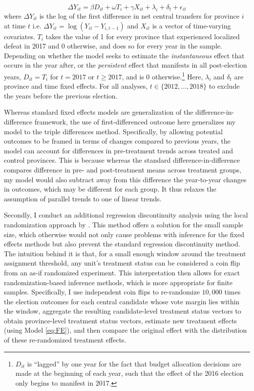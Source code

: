 \documentclass[12pt]{article}
\newcommand{\1}{\mathbbm{1}}
\begin{document}
\begin{equation}
\Delta Y_{it} = \beta D_{it} + \omega T_{i} + \gamma X_{it} + \lambda_i + \delta_t + \epsilon_{it} \label{eq:FE}
\end{equation}
where $\Delta Y_{it}$ is the log of the first difference in net central transfers for province $i$ at time $t$ i.e. $\Delta Y_{it} = \log(Y_{it} - Y_{i, t-1})$ and $X_{it}$ is a vector of time-varying covariates. $T_{i}$ takes the value of 1 for every province that experienced localized defeat in 2017 and 0 otherwise, and does so for every year in the sample. Depending on whether the model seeks to estimate the \textit{instantaneous} effect that occurs in the year after, or the \textit{persistent} effect that manifests in all post-election years, $D_{it} = T_{i}$ for $t=2017$ or $t\geq2017$, and is  $0$ otherwise.\footnote{$D_{it}$ is ``lagged'' by one year for the fact that budget allocation decisions are made at the beginning of each year, such that the effect of the 2016 election only begins to manifest in 2017.} Here, $\lambda_i$ and $\delta_t$ are province and time fixed effects. For all analyses, $t \in \{2012, \ldots, 2018\}$ to exclude the years before the previous election.

Whereas standard fixed effects models are generalization of the difference-in-difference framework, the use of first-differenced outcome here generalizes my model to the triple differences method. Specifically, by allowing potential outcomes to be framed in terms of changes compared to previous years, the model can account for differences in pre-treatment trends across treated and control provinces. This is because whereas the standard difference-in-difference compares difference in pre- and post-treatment means across treatment groups, my model would also subtract away from this difference the year-to-year changes in outcomes, which may be different for each group. It thus relaxes the assumption of parallel trends to one of linear trends.

Secondly, I conduct an additional regression discontinuity analysis using the local randomization approach by \citet{CattaneoTitiunik2015}. This method offers a solution for the small sample size, which otherwise would not only cause problems with inference for the fixed effects methods but also prevent the standard regression discontinuity method. The intuition behind it is that, for a small enough window around the treatment assignment threshold, any unit's treatment status can be considered a coin flip from an as-if randomized experiment. This interpretation then allows for exact randomization-based inference methods, which is more appropriate for finite samples. Specifically, I use independent coin flips to re-randomize $10,000$ times the election outcomes for each central candidate whose vote margin lies within the window, aggregate the resulting candidate-level treatment status vectors to obtain province-level treatment status vectors, estimate new treatment effects (using Model \ref{eq:FE}), and then compare the original effect with the distribution of these re-randomized treatment effects.
\end{document}
